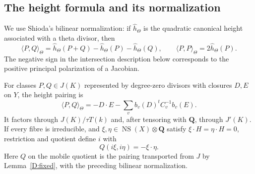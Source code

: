 \subsection{The height formula and its normalization}

We use Shioda's bilinear normalization: if $\widehat h_\Theta$ is the
quadratic canonical height associated with a theta divisor, then
\[
 \langle P,Q\rangle_\Theta
  =\widehat h_\Theta(P+Q)-\widehat h_\Theta(P)-\widehat h_\Theta(Q),
 \qquad \langle P,P\rangle_\Theta=2\widehat h_\Theta(P).
\]
The negative sign in the intersection description below corresponds to
the positive principal polarization of a Jacobian.

\begin{theorem}
\label{D:height}
For classes $P,Q\in J(K)$ represented by degree-zero divisors with
closures $D,E$ on $Y$, the height pairing is
\[
 \boxed{\langle P,Q\rangle_\Theta
             =-D\cdot E-\sum_v b_v(D)^tC_v^{-1}b_v(E).}
\]
It factors through $J(K)/\tau T(k)$ and, after tensoring with
$\mathbf Q$, through $J'(K)$.  If every fibre is irreducible, and
$\xi,\eta\in\operatorname{NS}(X)\otimes\mathbf Q$ satisfy
$\xi\cdot H=\eta\cdot H=0$, restriction and quotient define $i$ with
\[
                   \boxed{Q(i\xi,i\eta)=-\xi\cdot\eta.}
\]
Here $Q$ on the mobile quotient is the pairing transported from $J$ by
Lemma~\ref{D:fixed}, with the preceding bilinear normalization.
\end{theorem}
